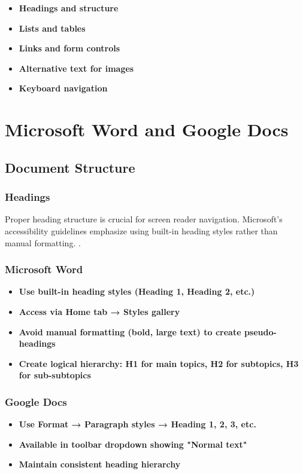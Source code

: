\begin{itemize}
\item \textbf{Headings and structure}
\item \textbf{Lists and tables}
\item \textbf{Links and form controls}
\item \textbf{Alternative text for images}
\item \textbf{Keyboard navigation}
\end{itemize}

\section{Microsoft Word and Google Docs}
\label{sec:word-google-docs}

\subsection{Document Structure}

\subsubsection{Headings}
Proper heading structure is crucial for screen reader navigation. Microsoft's accessibility guidelines emphasize using built-in heading styles rather than manual formatting.
 \cite{MicrosoftWord2023}.

\subsubsection{Microsoft Word}
\vspace{1em}
\begin{itemize}
\item \textbf{Use built-in heading styles (Heading 1, Heading 2, etc.)}
\item \textbf{Access via Home tab → Styles gallery}
\item \textbf{Avoid manual formatting (bold, large text) to create pseudo-headings}
\item \textbf{Create logical hierarchy: H1 for main topics, H2 for subtopics, H3 for sub-subtopics}
\end{itemize}
\vspace{1em}

\subsubsection{Google Docs}
\vspace{1em}
\begin{itemize}
\item \textbf{Use Format → Paragraph styles → Heading 1, 2, 3, etc.}
\item \textbf{Available in toolbar dropdown showing "Normal text"}
\item \textbf{Maintain consistent heading hierarchy}
\end{itemize}
\vspace{1em}

